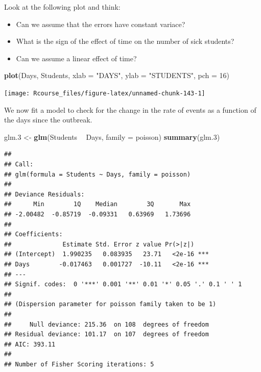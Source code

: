 \documentclass[]{book}
\newenvironment{Shaded}{\begin{snugshade}}{\end{snugshade}}
\newcommand{\KeywordTok}[1]{\textcolor[rgb]{0.13,0.29,0.53}{\textbf{#1}}}
\newcommand{\DataTypeTok}[1]{\textcolor[rgb]{0.13,0.29,0.53}{#1}}
\newcommand{\DecValTok}[1]{\textcolor[rgb]{0.00,0.00,0.81}{#1}}
\newcommand{\StringTok}[1]{\textcolor[rgb]{0.31,0.60,0.02}{#1}}
\newcommand{\OperatorTok}[1]{\textcolor[rgb]{0.81,0.36,0.00}{\textbf{#1}}}
\newcommand{\NormalTok}[1]{#1}
\providecommand{\tightlist}{%
  \setlength{\itemsep}{0pt}\setlength{\parskip}{0pt}}
\theoremstyle{definition}
\theoremstyle{definition}
\theoremstyle{definition}
\theoremstyle{remark}
\begin{document}
Look at the following plot and think:

\begin{itemize}
\tightlist
\item
  Can we assume that the errors have constant variace?
\item
  What is the sign of the effect of time on the number of sick students?
\item
  Can we assume a linear effect of time?
\end{itemize}

\begin{Shaded}
\begin{Highlighting}[]
\KeywordTok{plot}\NormalTok{(Days, Students, }\DataTypeTok{xlab =} \StringTok{"DAYS"}\NormalTok{, }\DataTypeTok{ylab =} \StringTok{"STUDENTS"}\NormalTok{, }\DataTypeTok{pch =} \DecValTok{16}\NormalTok{)}
\end{Highlighting}
\end{Shaded}

\texttt{[image: Rcourse\_files/figure-latex/unnamed-chunk-143-1]}

We now fit a model to check for the change in the rate of events as a
function of the days since the outbreak.

\begin{Shaded}
\begin{Highlighting}[]
\NormalTok{glm.}\DecValTok{3}\NormalTok{ <-}\StringTok{ }\KeywordTok{glm}\NormalTok{(Students }\OperatorTok{~}\StringTok{ }\NormalTok{Days, }\DataTypeTok{family =}\NormalTok{ poisson)}
\KeywordTok{summary}\NormalTok{(glm.}\DecValTok{3}\NormalTok{)}
\end{Highlighting}
\end{Shaded}

\begin{verbatim}
## 
## Call:
## glm(formula = Students ~ Days, family = poisson)
## 
## Deviance Residuals: 
##      Min        1Q    Median        3Q       Max  
## -2.00482  -0.85719  -0.09331   0.63969   1.73696  
## 
## Coefficients:
##              Estimate Std. Error z value Pr(>|z|)    
## (Intercept)  1.990235   0.083935   23.71   <2e-16 ***
## Days        -0.017463   0.001727  -10.11   <2e-16 ***
## ---
## Signif. codes:  0 '***' 0.001 '**' 0.01 '*' 0.05 '.' 0.1 ' ' 1
## 
## (Dispersion parameter for poisson family taken to be 1)
## 
##     Null deviance: 215.36  on 108  degrees of freedom
## Residual deviance: 101.17  on 107  degrees of freedom
## AIC: 393.11
## 
## Number of Fisher Scoring iterations: 5
\end{verbatim}
\end{document}
